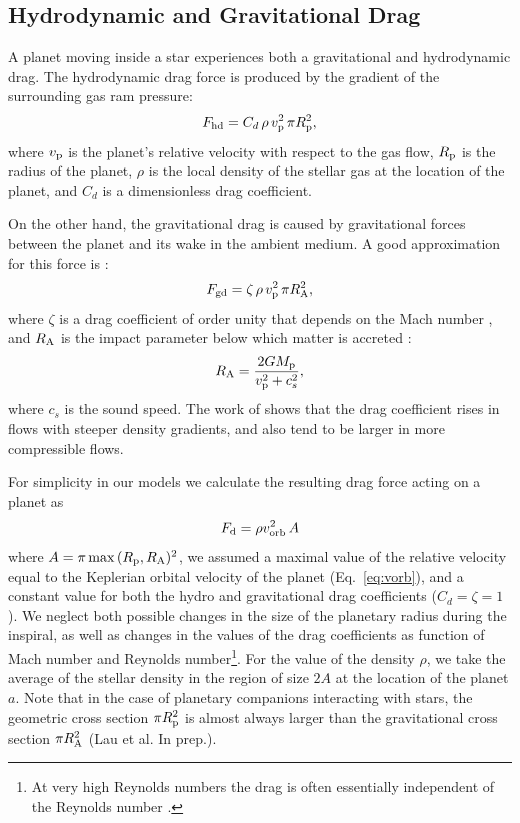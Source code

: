 \documentclass[twocolumn]{aastex62}
\begin{document}
\subsection{Hydrodynamic and Gravitational Drag}
A planet moving inside a star experiences both a
gravitational and hydrodynamic drag. The hydrodynamic drag force is produced by the gradient of the surrounding gas ram pressure:
\begin{equation}
F_{\rm hd}= C_d\, \rho\, v_{\rm p}^2\,\pi R_{\rm p}^2,
\label{eqQ:hydrodrag}
\end{equation}
where $v_{\rm p}$ is the planet's relative velocity with respect to the gas flow, $R_{\rm p}$ is the radius of the  planet, $\rho$ is the local density of the stellar gas at the location of the planet, and $C_d$ is a dimensionless drag coefficient. 

On the other hand, the gravitational drag is caused by gravitational forces between the planet and its wake in the ambient medium. A good approximation for this force is \citep[e.g.][]{Iben:1993}:
\begin{equation}
F_{\rm gd}= \zeta\, \rho\, v_{\rm p}^2\,\pi R_{\rm A}^2,
\label{eq:gravdrag}
\end{equation}
where $\zeta$ is a drag coefficient of order unity that depends on the Mach number \citep{Shima:1985,Ostriker:1999}, 
and $R_{\rm A}$ is  the impact parameter below which matter is accreted \citep{Bondi:1952,Iben:1993}:
\begin{equation}
R_{\rm A}=\frac{2GM_{\rm p}}{v_{\rm p}^2+c_s^2},
\label{eq:rabondi}
\end{equation}
where $c_s$ is the 
sound speed. The work of \citet{MacLeod:2015,MacLeod:2017} shows that the drag coefficient rises in flows with steeper density gradients, and also tend to be larger in more compressible flows. 

For simplicity in our models we calculate the resulting drag force acting on a planet as
\begin{equation}
F_{\rm d}= \rho v_{\rm orb}^2 \,A 
\label{eq:rabondi}
\end{equation}
where $A = \pi\,{\rm max}\,(R_{\rm p}, R_{\rm A})^2$, we assumed a maximal value of the relative velocity equal to the Keplerian orbital velocity of the planet (Eq.~\ref{eq:vorb}), and a constant value for both the hydro and gravitational drag coefficients ($C_d = \zeta = 1$). We neglect both possible changes in the size of the planetary radius during the inspiral, as well as changes in the values of the drag coefficients as function of Mach number \citep{Ostriker:1999} and Reynolds number\footnote{At very high Reynolds numbers the drag is often essentially independent of the Reynolds number \citep[see e.g.][]{Munson:2005}.}. For the value of the density $\rho$, we take the average of the stellar density in the region of size $2A$ at the location of the planet $a$. Note that in the case of planetary companions interacting with stars, the geometric cross section $\pi R_{\rm p}^2$ is almost always larger than the gravitational cross section $\pi R_{\rm A}^2$ (Lau et al. In prep.). 
\end{document}
